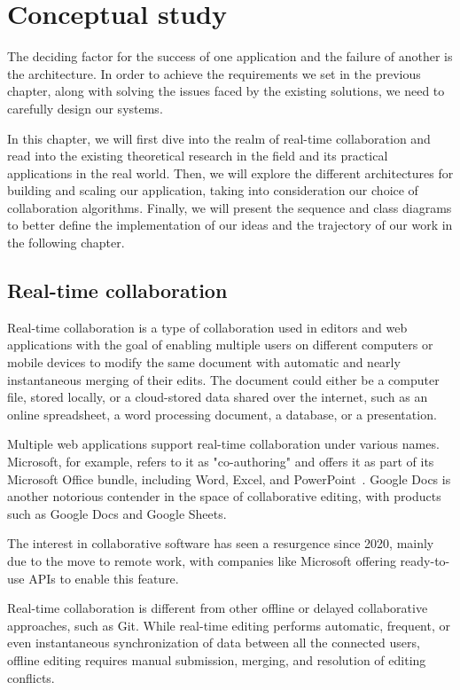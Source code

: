 \chapter{Conceptual study}
\label{chap:conceptual}

The deciding factor for the success of one application and the failure of another is the architecture.
In order to achieve the requirements we set in the previous chapter, along with solving the issues faced by the existing solutions, we need to carefully design our systems.

In this chapter, we will first dive into the realm of real-time collaboration and read into the existing theoretical research in the field and its practical applications in the real world.
Then, we will explore the different architectures for building and scaling our application, taking into consideration our choice of collaboration algorithms.
Finally, we will present the sequence and class diagrams to better define the implementation of our ideas and the trajectory of our work in the following chapter.

\section{Real-time collaboration}

Real-time collaboration is a type of collaboration used in editors and web applications with the goal of enabling multiple users on different computers or mobile devices to modify the same document with automatic and nearly instantaneous merging of their edits.
The document could either be a computer file, stored locally, or a cloud-stored data shared over the internet, such as an online spreadsheet, a word processing document, a database, or a presentation.

Multiple web applications support real-time collaboration under various names.
Microsoft, for example, refers to it as "co-authoring" and offers it as part of its Microsoft Office bundle, including Word, Excel, and PowerPoint~\autocite{noauthor_document_nodate}.
Google Docs is another notorious contender in the space of collaborative editing, with products such as Google Docs and Google Sheets.

The interest in collaborative software has seen a resurgence since 2020, mainly due to the move to remote work, with companies like Microsoft offering ready-to-use APIs to enable this feature.

Real-time collaboration is different from other offline or delayed collaborative approaches, such as Git.
While real-time editing performs automatic, frequent, or even instantaneous synchronization of data between all the connected users, offline editing requires manual submission, merging, and resolution of editing conflicts.

